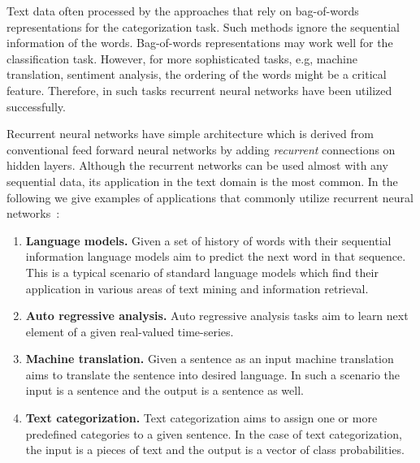 Text data often processed by the approaches that rely on  bag-of-words representations for the categorization task. 
Such methods ignore the sequential information of the words. Bag-of-words representations may work well for the classification task. However, for more sophisticated tasks, e.g, machine translation, sentiment analysis, the ordering of the words might be a critical feature. Therefore, in such tasks recurrent neural networks have been utilized successfully. 

Recurrent neural networks have simple architecture which is derived from conventional feed forward neural networks by adding \textit{recurrent} connections on hidden layers. Although the recurrent networks can be used almost with any sequential data, its application in the text domain is the most common. In the following we give examples of applications that commonly utilize recurrent neural networks~\cite{DBLP:books/sp/Aggarwal18}:\\
\begin{enumerate}
\item \textbf{Language models.} Given a set of history of words with their sequential information language models aim to predict the next word in that sequence. This is a typical scenario of standard language models which find their application in various areas of text mining and information retrieval.\\

\item \textbf{Auto regressive analysis.} Auto regressive analysis tasks aim to learn next element of a given real-valued time-series.\\

\item \textbf{Machine translation.} Given a sentence as an input machine translation aims to translate the sentence into desired language. In such a scenario the input is a sentence and the output is a sentence as well.\\

\item \textbf{Text categorization.} Text categorization aims to assign one or more predefined categories to a given sentence. In the case of text categorization, the input is a pieces of text and the output is a vector of class probabilities. \\

\end{enumerate}
